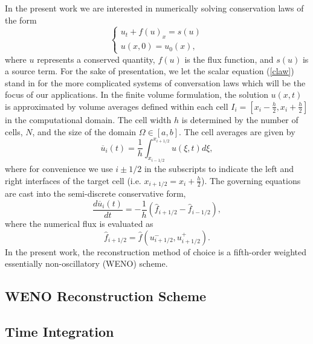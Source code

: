 \documentclass[12pt,letterpaper]{article}
\begin{document}
    In the present work we are interested in numerically solving conservation
    laws of the form
    \begin{equation}
    \begin{cases}
      u_{t} + f(u)_{x} = s(u) \\    
      u(x,0) = u_{0}(x),
    \end{cases}
    \label{claw}
    \end{equation} where $u$ represents a conserved quantity, $f(u)$ is the flux
    function, and $s(u)$ is a source term. For the sake of presentation, we let
    the scalar equation (\ref{claw}) stand in for the more complicated systems
    of conversation laws which will be the focus of our applications.  In the
    finite volume formulation, the solution $u(x,t)$ is approximated by volume
    averages defined within each cell $I_{i} = \left[ x_{i}-\frac{h}{2},
    x_{i}+\frac{h}{2} \right]$ in the computational domain.  The cell width $h$
    is determined by the number of cells, $N$, and the size of the domain
    $\Omega \in \left[a,b\right]$.  The cell averages are given by
    \begin{equation}
        \overline{u}_{i}(t) = \frac{1}{h} \int_{x_{i-1/2}}^{x_{i+1/2}} u(\xi,t) d \xi,
    \end{equation}
    where for convenience we use $i \pm 1/2$ in the subscripts to
    indicate the left and right interfaces of the target cell (i.e.
    $x_{i+1/2} =
    x_{i} + \frac{h}{2}$). The governing equations are cast into the
    semi-discrete conservative form,
    \begin{equation}
        \frac{d\overline{u}_{i}(t)}{dt} = -\frac{1}{h} \left( \hat{f}_{i+1/2} -
        \hat{f}_{i-1/2} \right),
        \label{ode}
    \end{equation}
    where the numerical flux is evaluated as
    \begin{equation}
        \hat{f}_{i + 1/2} = \hat{f}(u^{-}_{i+1/2}, u^{+}_{i+1/2}).
    \end{equation}
    In the present work, the reconstruction method of choice is a fifth-order
    weighted essentially non-oscillatory (WENO) scheme.

    \subsection{WENO Reconstruction Scheme}

    \subsection{Time Integration}
     
\end{document}
